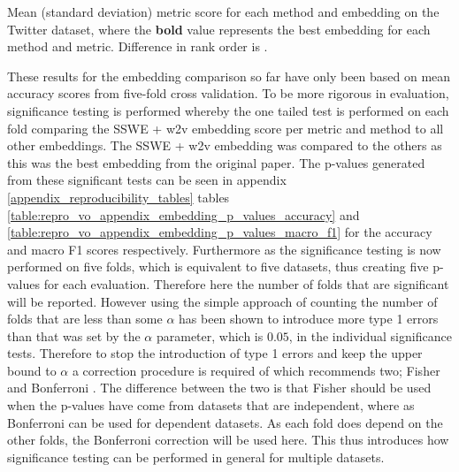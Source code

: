 \FloatBarrier
\begin{table}[!h]
    \centering
    
    \caption{Mean (standard deviation) metric score for each method and embedding on the \citet{dong-etal-2014-adaptive} Twitter dataset, where the \textbf{bold} value represents the best embedding for each method and metric. Difference in rank order is .}
    \label{table:repro_vo_word_embeddings_results}
\end{table}
\FloatBarrier

These results for the embedding comparison so far have only been based on mean accuracy scores from five-fold cross validation. To be more rigorous in evaluation, significance testing is performed whereby the one tailed test is performed on each fold comparing the SSWE + w2v embedding score per metric and method to all other embeddings. The SSWE + w2v embedding was compared to the others as this was the best embedding from the original paper. The p-values generated from these significant tests can be seen in appendix \ref{appendix_reproducibility_tables} tables \ref{table:repro_vo_appendix_embedding_p_values_accuracy} and \ref{table:repro_vo_appendix_embedding_p_values_macro_f1} for the accuracy and macro F1 scores respectively. Furthermore as the significance testing is now performed on five folds, which is equivalent to five datasets, thus creating five p-values for each evaluation. Therefore here the number of folds that are significant will be reported. However using the simple approach of counting the number of folds that are less than some $\alpha$ has been shown to introduce more type 1 errors \citep{dror-etal-2017-replicability} than that was set by the $\alpha$ parameter, which is $0.05$, in the individual significance tests. Therefore to stop the introduction of type 1 errors and keep the upper bound to $\alpha$ a correction procedure is required of which \citet{dror-etal-2018-hitchhikers} recommends two; Fisher and Bonferroni \citep{benjamini2008screening}. The difference between the two is that Fisher should be used when the p-values have come from datasets that are independent, where as Bonferroni can be used for dependent datasets. As each fold does depend on the other folds, the Bonferroni correction will be used here. This thus introduces how significance testing can be performed in general for multiple datasets.

